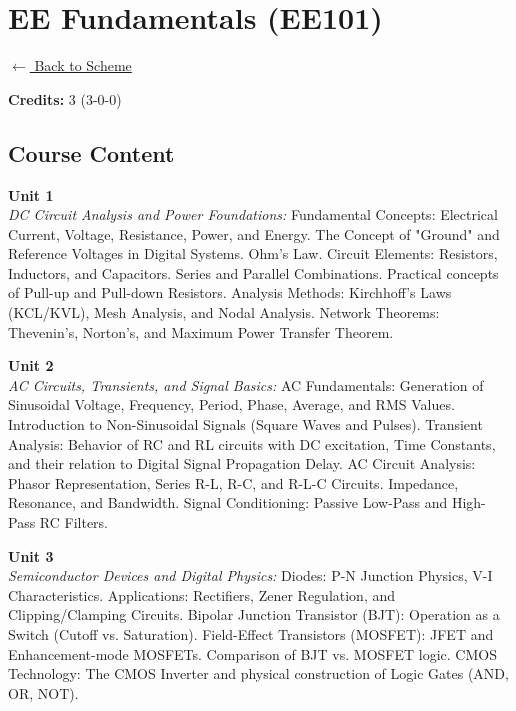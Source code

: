 \section*{EE Fundamentals (EE101)}
\label{course:EE101}

\noindent \small{\hyperref[main:scheme]{$\leftarrow$ Back to Scheme}} \vspace{0.5cm}

\noindent \textbf{Credits:} 3 (3-0-0)

\subsection*{Course Content}
\noindent\textbf{Unit 1} \\
\textit{DC Circuit Analysis and Power Foundations:} Fundamental Concepts: Electrical Current, Voltage, Resistance, Power, and Energy. The Concept of "Ground" and Reference Voltages in Digital Systems. Ohm's Law. Circuit Elements: Resistors, Inductors, and Capacitors. Series and Parallel Combinations. Practical concepts of Pull-up and Pull-down Resistors. Analysis Methods: Kirchhoff's Laws (KCL/KVL), Mesh Analysis, and Nodal Analysis. Network Theorems: Thevenin’s, Norton’s, and Maximum Power Transfer Theorem.

\vspace{0.3cm}

\noindent\textbf{Unit 2} \\
\textit{AC Circuits, Transients, and Signal Basics:} AC Fundamentals: Generation of Sinusoidal Voltage, Frequency, Period, Phase, Average, and RMS Values. Introduction to Non-Sinusoidal Signals (Square Waves and Pulses). Transient Analysis: Behavior of RC and RL circuits with DC excitation, Time Constants, and their relation to Digital Signal Propagation Delay. AC Circuit Analysis: Phasor Representation, Series R-L, R-C, and R-L-C Circuits. Impedance, Resonance, and Bandwidth. Signal Conditioning: Passive Low-Pass and High-Pass RC Filters.

\vspace{0.3cm}

\noindent\textbf{Unit 3} \\
\textit{Semiconductor Devices and Digital Physics:} Diodes: P-N Junction Physics, V-I Characteristics. Applications: Rectifiers, Zener Regulation, and Clipping/Clamping Circuits. Bipolar Junction Transistor (BJT): Operation as a Switch (Cutoff vs. Saturation). Field-Effect Transistors (MOSFET): JFET and Enhancement-mode MOSFETs. Comparison of BJT vs. MOSFET logic. CMOS Technology: The CMOS Inverter and physical construction of Logic Gates (AND, OR, NOT).

